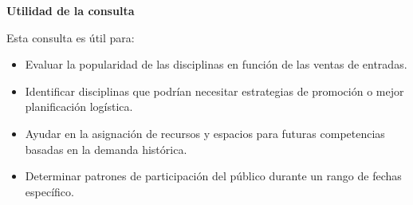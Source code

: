 \textbf{Utilidad de la consulta}

Esta consulta es útil para:
\begin{itemize}
    \item Evaluar la popularidad de las disciplinas en función de las ventas de entradas.
    \item Identificar disciplinas que podrían necesitar estrategias de promoción o mejor planificación logística.
    \item Ayudar en la asignación de recursos y espacios para futuras competencias basadas en la demanda histórica.
    \item Determinar patrones de participación del público durante un rango de fechas específico.
\end{itemize}
